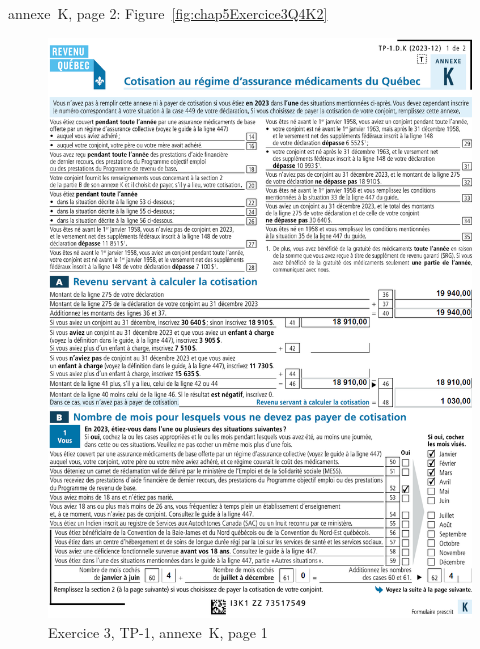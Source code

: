 annexe~K, page 2: Figure~\ref{fig:chap5Exercice3Q4K2}
\begin{figure}
	\centering
	\includegraphics[width=.9\textwidth]{exercice/5-3/Q4/AnnexeK-page1.png}
	\caption[]{Exercice 3, TP-1, annexe~K, page 1}
	\label{fig:chap5Exercice3Q4K1}
\end{figure}
